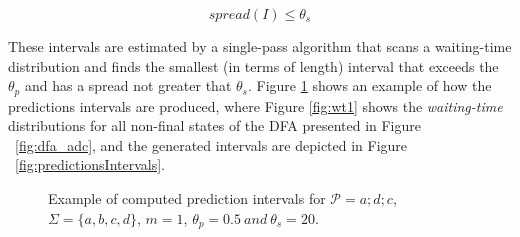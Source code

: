 \begin{equation*}
spread(I)\leq \theta_{s}
\end{equation*}

These intervals are estimated by a single-pass algorithm that scans a waiting-time distribution and finds the smallest (in terms of length) interval that exceeds the $\theta_{p}$ and has a spread  not greater that $\theta_{s}$. Figure \ref{fig:wtdfas} shows an example of how the predictions intervals are produced, where Figure \ref{fig:wt1} shows the \textit{waiting-time} distributions for all non-final states of the DFA presented in Figure ~\ref{fig:dfa_adc}, and the generated intervals are  depicted in Figure ~\ref{fig:predictionsIntervals}.


\begin{figure}[!ht]
	\begin{centering}
		
	
		
		\caption{Example of computed prediction intervals for
			$\mathcal{P}=a ; d ; c$, $\Sigma=\{a,b,c,d\}$, $m=1$, $\theta_{p}=0.5\ and\ \theta_{s}=20$.}
		\label{fig:wtdfas}
	\end{centering}
\end{figure}

